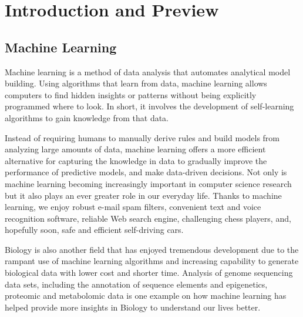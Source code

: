 \chapter{Introduction and Preview} %

\label{Chapter1} %


\newcommand{\keyword}[1]{\textbf{#1}}
\newcommand{\tabhead}[1]{\textbf{#1}}
\newcommand{\code}[1]{\texttt{#1}}
\newcommand{\file}[1]{\texttt{\bfseries#1}}
\newcommand{\option}[1]{\texttt{\itshape#1}}


\section{Machine Learning}
Machine learning is a method of data analysis that automates analytical model building. Using algorithms that learn from data, machine learning allows computers to find hidden insights or patterns without being explicitly programmed where to look. In short, it involves the development of self-learning algorithms to gain knowledge from that data.

Instead of requiring humans to manually derive rules and build models from analyzing large amounts of data, machine learning offers a more efficient alternative for capturing the knowledge in data to gradually improve the performance of predictive models, and make data-driven decisions. Not only is machine learning becoming increasingly important in computer science research but it also plays an ever greater role in our everyday life. Thanks to machine learning, we enjoy robust e-mail spam filters, convenient text and voice recognition software, reliable Web search engine, challenging chess players, and, hopefully soon, safe and efficient self-driving cars.

Biology is also another field that has enjoyed tremendous development due to the rampant use of machine learning algorithms \cite{Libbrecht2015} and increasing capability to generate biological data with lower cost and shorter time. Analysis of genome sequencing data sets, including the annotation of sequence elements and epigenetics, proteomic and metabolomic data is one example on how machine learning has helped provide more insights in Biology to understand our lives better.

